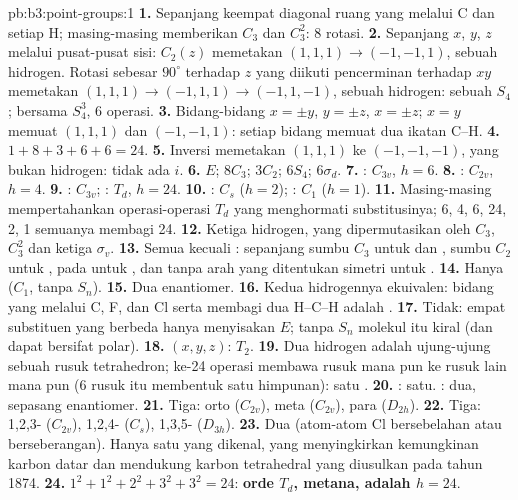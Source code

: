 \begin{solution}{pb:b3:point-groups:1}
\textbf{1.} Sepanjang keempat diagonal ruang yang melalui C dan setiap H;
masing-masing memberikan $C_3$ dan $C_3^2$: 8 rotasi.
\textbf{2.} Sepanjang $x$, $y$, $z$ melalui pusat-pusat sisi: $C_2(z)$ memetakan
$(1,1,1)
\to (-1,-1,1)$, sebuah hidrogen. Rotasi sebesar $90^\circ$ terhadap $z$
yang diikuti pencerminan terhadap $xy$ memetakan
$(1,1,1) \to (-1,1,1) \to (-1,1,-1)$, sebuah hidrogen: sebuah $S_4$; bersama
$S_4^3$, 6 operasi.
\textbf{3.} Bidang-bidang $x = \pm y$, $y = \pm z$, $x = \pm z$; $x = y$ memuat
$(1,1,1)$ dan $(-1,-1,1)$: setiap bidang memuat dua ikatan C--H.
\textbf{4.} $1 + 8 + 3 + 6 + 6 = 24$.
\textbf{5.} Inversi memetakan $(1,1,1)$ ke $(-1,-1,-1)$, yang bukan hidrogen:
tidak ada $i$.
\textbf{6.} $E$; $8C_3$; $3C_2$; $6S_4$; $6\sigma_d$.
\textbf{7.} : $C_{3v}$, $h = 6$.
\textbf{8.} : $C_{2v}$, $h = 4$.
\textbf{9.} : $C_{3v}$; : $T_d$, $h = 24$.
\textbf{10.} : $C_s$ ($h = 2$); : $C_1$ ($h = 1$).
\textbf{11.} Masing-masing mempertahankan operasi-operasi $T_d$ yang
menghormati substitusinya; 6, 4, 6, 24, 2, 1 semuanya membagi 24.
\textbf{12.} Ketiga hidrogen, yang dipermutasikan oleh $C_3$, $C_3^2$ dan ketiga
$\sigma_v$.
\textbf{13.} Semua kecuali : sepanjang sumbu $C_3$ untuk  dan
, sumbu $C_2$ untuk , pada  untuk
, dan tanpa arah yang ditentukan simetri untuk .
\textbf{14.} Hanya  ($C_1$, tanpa $S_n$).
\textbf{15.} Dua enantiomer.
\textbf{16.} Kedua hidrogennya ekuivalen: bidang yang melalui C, F, dan Cl
serta membagi dua H--C--H adalah .
\textbf{17.} Tidak: empat substituen yang berbeda hanya menyisakan $E$; tanpa
$S_n$ molekul itu kiral (dan dapat bersifat polar).
\textbf{18.} $(x, y, z)$: $T_2$.
\textbf{19.} Dua hidrogen adalah ujung-ujung sebuah rusuk tetrahedron; ke-24
operasi membawa rusuk mana pun ke rusuk lain mana pun (6 rusuk itu membentuk
satu himpunan): satu .
\textbf{20.} : satu. : dua, sepasang enantiomer.
\textbf{21.} Tiga: orto ($C_{2v}$), meta ($C_{2v}$), para ($D_{2h}$).
\textbf{22.} Tiga: 1,2,3- ($C_{2v}$), 1,2,4- ($C_s$), 1,3,5- ($D_{3h}$).
\textbf{23.} Dua (atom-atom Cl bersebelahan atau berseberangan). Hanya satu
 yang dikenal, yang menyingkirkan kemungkinan karbon datar dan
mendukung karbon tetrahedral yang diusulkan pada tahun 1874.
\textbf{24.} $1^2 + 1^2 + 2^2 + 3^2 + 3^2 = 24$: \textbf{orde $T_d$, 
metana, adalah $h = 24$}.
\end{solution}
